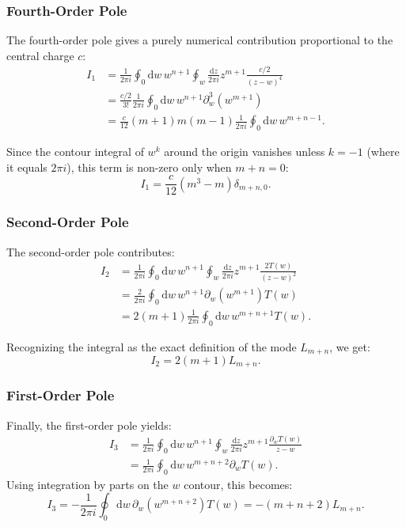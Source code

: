 \subsubsection{Fourth-Order Pole}

The fourth-order pole gives a purely numerical contribution proportional to the central charge \(c\):
\[
    \begin{aligned}
        I_1 & = \frac{1}{2\pi i} \oint_0 \mathrm{d}w \, w^{n+1} \oint_w \frac{\mathrm{d}z}{2\pi i} z^{m+1} \frac{c/2}{(z-w)^4} \\
            & = \frac{c/2}{3!} \frac{1}{2\pi i} \oint_0 \mathrm{d}w \, w^{n+1} \partial_w^3 (w^{m+1})                          \\
            & = \frac{c}{12} (m+1)m(m-1) \frac{1}{2\pi i} \oint_0 \mathrm{d}w \, w^{m+n-1}.
    \end{aligned}
\]

Since the contour integral of \(w^k\) around the origin vanishes unless \(k = -1\) (where it equals \(2\pi i\)), this term is non-zero only when \(m+n = 0\):
\[
    I_1 = \frac{c}{12} (m^3 - m) \delta_{m+n, 0}.
\]

\subsubsection{Second-Order Pole}

The second-order pole contributes:
\[
    \begin{aligned}
        I_2 & = \frac{1}{2\pi i} \oint_0 \mathrm{d}w \, w^{n+1} \oint_w \frac{\mathrm{d}z}{2\pi i} z^{m+1} \frac{2T(w)}{(z-w)^2} \\
            & = \frac{2}{2\pi i} \oint_0 \mathrm{d}w \, w^{n+1} \partial_w (w^{m+1}) T(w)                                        \\
            & = 2(m+1) \frac{1}{2\pi i} \oint_0 \mathrm{d}w \, w^{m+n+1} T(w).
    \end{aligned}
\]

Recognizing the integral as the exact definition of the mode \(L_{m+n}\), we get:
\[
    I_2 = 2(m+1) L_{m+n}.
\]

\subsubsection{First-Order Pole}

Finally, the first-order pole yields:
\[
    \begin{aligned}
        I_3 & = \frac{1}{2\pi i} \oint_0 \mathrm{d}w \, w^{n+1} \oint_w \frac{\mathrm{d}z}{2\pi i} z^{m+1} \frac{\partial_w T(w)}{z-w} \\
            & = \frac{1}{2\pi i} \oint_0 \mathrm{d}w \, w^{m+n+2} \partial_w T(w).
    \end{aligned}
\]
Using integration by parts on the \(w\) contour, this becomes:
\[
    I_3 = - \frac{1}{2\pi i} \oint_0 \mathrm{d}w \, \partial_w (w^{m+n+2}) T(w) = - (m+n+2) L_{m+n}.
\]

